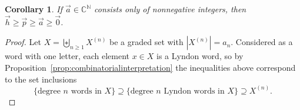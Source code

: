 \documentclass[11pt]{amsart}
\newtheorem{corollary}[theorem]{Corollary}
\theoremstyle{definition}
\numberwithin{equation}{section}
\def\NN{{\mathbb N}}
\def\CC{{\mathbb C}}
\begin{document}
\begin{corollary}
If $\vec{a} \in \CC^{\NN}$ consists only of nonnegative integers, then $\vec{h} \geq \vec{p} \geq \vec{a} \geq \vec{0}$.
\end{corollary}
\begin{proof}
Let $X = \biguplus_{n \ge 1} X^{(n)}$ be a graded set with $|X^{(n)}| = a_{n}$.  
Considered as a word with one letter, each element $x \in X$ is a Lyndon word, so by Proposition~\ref{prop:combinatorialinterpretation} the inequalities above correspond to the set inclusions
\[
\{\text{degree $n$ words in $X$}\} 
\supseteq \{\text{degree $n$ Lyndon words in $X$}\} 
\supseteq X^{(n)}.
\]
\end{proof}
\end{document}
